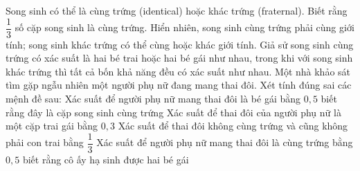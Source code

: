 \begin{ex}
	Song sinh có thể là cùng trứng (identical) hoặc khác trứng (fraternal). Biết rằng $\dfrac{1}{3}$ số cặp song sinh là cùng trứng. Hiển nhiên, song sinh cùng trứng phải cùng giới tính; song sinh khác trứng có thể cùng hoặc khác giới tính. Giả sử song sinh cùng trứng có xác suất là hai bé trai hoặc hai bé gái như nhau, trong khi với song sinh khác trứng thì tất cả bốn khả năng đều có xác suất như nhau. Một nhà khảo sát tìm gặp ngẫu nhiên một người phụ nữ đang mang thai đôi.
	Xét tính đúng sai các mệnh đề sau:
	\choiceTF
	{\True Xác suất để người phụ nữ mang thai đôi là bé gái bằng $0,5$ biết rằng đây là cặp song sinh cùng trứng}
	{ Xác suất để thai đôi của người phụ nữ là một cặp trai gái bằng $0,3$}
	{Xác suất để thai đôi không cùng trứng và cũng không phải con trai bằng $\dfrac{1}{3}$}
	{\True Xác suất để người phụ nữ mang thai đôi là cùng trứng bằng $0,5$ biết rằng cô ấy hạ sinh được hai bé gái}
\end{ex}
